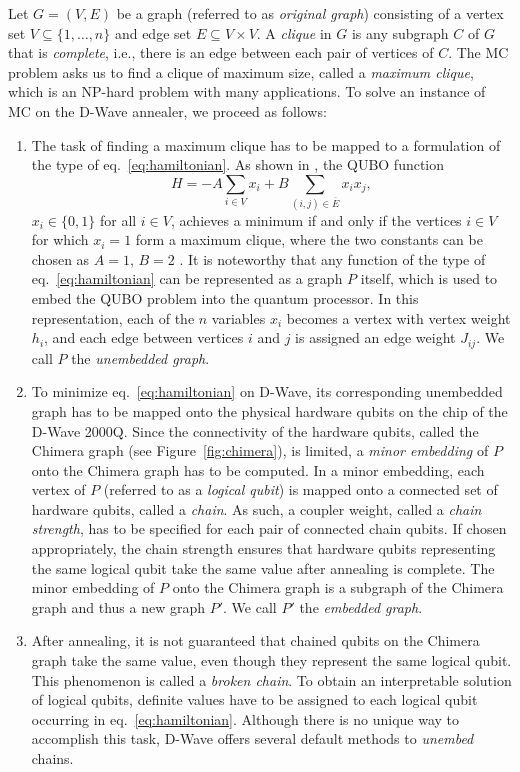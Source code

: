 \documentclass[a4paper,11pt]{article}
\begin{document}
Let $G=(V,E)$ be a graph (referred to as \textit{original graph}) consisting of a vertex set $V \subseteq \{1,\ldots,n\}$ and edge set $E \subseteq V \times V$. A \textit{clique} in $G$ is any subgraph $C$ of $G$ that is \textit{complete}, i.e., there is an edge between each pair of vertices of $C$. The MC problem asks us to find a clique of maximum size, called a \textit{maximum clique}, which is an NP-hard problem with many applications. To solve an instance of MC on the D-Wave annealer, we proceed as follows:
\begin{enumerate}
    \item The task of finding a maximum clique has to be mapped to a formulation of the type of eq.~\eqref{eq:hamiltonian}. As shown in \cite{Chapuis2019,qtop}, the QUBO function
    \begin{equation}
        H = -A\sum_{i \in V} x_i + B\sum_{(i,j ) \in \overline{E}} x_i x_j,
        \label{eq:MC}
    \end{equation}
    $x_i\in\{0,1\}$ for all $i \in V$, achieves a minimum if and only if the vertices $i \in V$ for which $x_i=1$ form a maximum clique, where the two constants can be chosen as $A=1$, $B=2$ \cite{qtop}. It is noteworthy that any function of the type of eq.~\eqref{eq:hamiltonian} can be represented as a graph $P$ itself, which is used to embed the QUBO problem into the quantum processor. In this representation, each of the $n$ variables $x_i$ becomes a vertex with vertex weight $h_{i}$, and each edge between vertices $i$ and $j$ is assigned an edge weight $J_{ij}$. We call $P$ the \textit{unembedded graph}.
    \item To minimize eq.~\eqref{eq:hamiltonian} on D-Wave, its corresponding unembedded graph has to be mapped onto the physical hardware qubits on the chip of the D-Wave 2000Q. Since the connectivity of the hardware qubits, called the Chimera graph (see Figure~\ref{fig:chimera}), is limited, a \textit{minor embedding} of $P$ onto the Chimera graph has to be computed. In a minor embedding, each vertex of $P$ (referred to as a \textit{logical qubit}) is mapped onto a connected set of hardware qubits, called a \textit{chain}. As such, a coupler weight, called a \textit{chain strength}, has to be specified for each pair of connected chain qubits. If chosen appropriately, the chain strength ensures that hardware qubits representing the same logical qubit take the same value after annealing is complete. The minor embedding of $P$ onto the Chimera graph is a subgraph of the Chimera graph and thus a new graph $P'$. We call $P'$ the \textit{embedded graph}.
    \item After annealing, it is not guaranteed that chained qubits on the Chimera graph take the same value, even though they represent the same logical qubit. This phenomenon is called a \textit{broken chain}. To obtain an interpretable solution of logical qubits, definite values have to be assigned to each logical qubit occurring in eq.~\eqref{eq:hamiltonian}. Although there is no unique way to accomplish this task, D-Wave offers several default methods to \textit{unembed} chains.
\end{enumerate}
\end{document}
